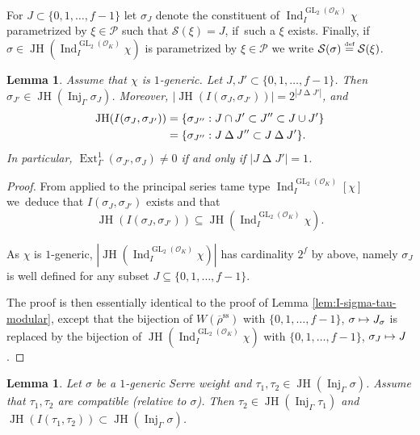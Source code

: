 \documentclass[JEP,XML,SOM,Unicode,NoFloatCountersInSection, NoEqCountersInSection,published]{cedram}
\newcommand\mto{\mathchoice{\longmapsto}{\mapsto}{\mapsto}{\mapsto}}
\newcommand{\defeq}{\stackrel{\textrm{\tiny{\upshape{def}}}}{=}}
\newcommand{\cO}{\mathcal{O}}
\newcommand{\cS}{\mathcal{S}}
\renewcommand{\ss}{\mathrm{ss}}
\newcommand{\brho}{\overline{\rho}}
\DeclareMathOperator{\Ext}{Ext}
\DeclareMathOperator{\GL}{GL}
\DeclareMathOperator{\Ind}{Ind}
\DeclareMathOperator{\Inj}{Inj}
\DeclareMathOperator{\JH}{\mathrm{JH}}
\theoremstyle{plain}
\newtheorem{lem}[prop]{Lemma}
\theoremstyle{definition}
\begin{document}
For $J \subset \{0,1,\dots,f-1\}$ let $\sigma_J$ denote the constituent of $\Ind_I^{\GL_2(\cO_K)} \chi$ parametrized by $\xi \in \mathcal P$ such that $\cS(\xi) = J$, if~such a $\xi$ exists.
Finally, if~$\sigma\in \JH(\Ind_I^{\GL_2(\cO_K)}\chi)$ is parametrized by $\xi \in \mathcal P$ we write $\cS(\sigma)\defeq\cS(\xi)$.

\begin{lem}\label{lem:I-sigma-tau-princ-series}
Assume that $\chi$ is $1$-generic.
Let $J, J' \subset \{0,1,\dots,f-1\}$.
Then $\sigma_{J'}\in\JH(\Inj_{\Gamma}\sigma_J)$.
Moreover, $|\JH(I(\sigma_J,\sigma_{J'}))|=2^{|J\mathbin\Delta J'|}$, and
\begin{align*}
\JH(I(\sigma_J,\sigma_{J'}))&=\{\sigma_{J''}: J\cap J'\subset J''\subset J\cup J'\} \\
&= \{\sigma_{J''}: J\mathbin\Delta J''\subset J\mathbin\Delta J'\}.\notag
\end{align*}
In particular, $\Ext^1_\Gamma(\sigma_{J'},\sigma_J) \ne 0$ if and only if $|J\mathbin\Delta J'| = 1$.
\end{lem}

\skpt
\begin{proof}
From \cite[Cor.\,2.22]{HuWang} applied to the principal series tame type $\Ind_I^{\GL_2(\cO_K)}[\chi]$ we~deduce that $I(\sigma_J,\sigma_{J'})$ exists and that
\[
\JH(I(\sigma_J,\sigma_{J'}))\subseteq \JH(\Ind_{I}^{\GL_2(\cO_K)}\chi).
\]

As $\chi$ is $1$-generic, $|\JH(\Ind_I^{\GL_2(\cO_K)}\chi)|$ has cardinality $2^f$ by above, namely $\sigma_J$ is well defined for any subset $J\subseteq \{0,1,\dots,f-1\}$.

The proof is then essentially identical to the proof of Lemma \ref{lem:I-sigma-tau-modular}, except that the bijection of $W(\brho^\ss)$ with $\{0,1,\dots,f-1\}$, $\sigma \mto J_\sigma$ is replaced by the bijection of $\JH(\Ind_I^{\GL_2(\cO_K)}\chi)$ with $\{0,1,\dots,f-1\}$, $\sigma_J \mto J$.
\end{proof}

\begin{lem}\label{lem:comp-JH}
Let $\sigma$ be a $1$-generic Serre weight and $\tau_1,\tau_2\in \JH(\Inj_{\Gamma}\sigma)$. Assume that $\tau_1,\tau_2$ are compatible (relative to $\sigma$). Then $\tau_2\in\JH(\Inj_{\Gamma}\tau_1)$ and $\JH(I(\tau_1,\tau_2))\subset \JH(\Inj_{\Gamma}\sigma)$.
\end{lem}
\end{document}
